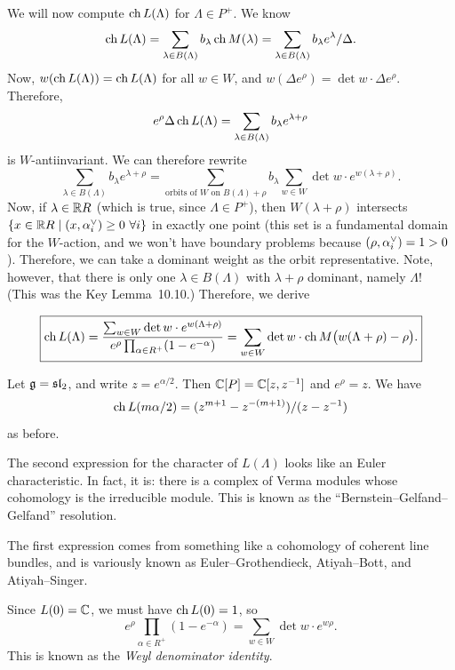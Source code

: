 We will now compute $\operatorname{ch} L(\Lambda)$ for $\Lambda \in P^+$. We know
\[
  \operatorname{ch} L(\Lambda) = \sum_{\lambda \in B(\Lambda)} b_\lambda \operatorname{ch} M(\lambda)
    = \sum_{\lambda \in B(\Lambda)} b_\lambda e^\lambda/\Delta.
\]
Now, $w(\operatorname{ch} L(\Lambda)) = \operatorname{ch} L(\Lambda)$ for all $w \in W$, and
$w(\Delta e^\rho) = \det w \cdot \Delta e^\rho$. Therefore,
\[
  e^\rho\Delta \operatorname{ch} L(\Lambda) = \sum_{\lambda \in B(\Lambda)} b_\lambda e^{\lambda+\rho}
\]
is $W$-antiinvariant. We can therefore rewrite
\[
  \sum_{\lambda \in B(\Lambda)} b_\lambda e^{\lambda+\rho}
  = \sum_{\text{orbits of } W \text{ on } B(\Lambda) + \rho} b_\lambda
    \sum_{w \in W} \det w \cdot e^{w(\lambda+\rho)}.
\]
Now, if $\lambda \in \mathbb{R} R$ (which is true, since $\Lambda \in P^+$), then
$W(\lambda + \rho)$ intersects
$\{x \in \mathbb{R} R \mid (x, \alpha_i^{\vee}) \geq 0 \ \forall i\}$ in exactly one point
(this set is a fundamental domain for the $W$-action, and we won't have
boundary problems because $(\rho, \alpha_i^{\vee}) = 1 > 0$). Therefore, we can
take a dominant weight as the orbit representative. Note, however, that there
is only one $\lambda \in B(\Lambda)$ with $\lambda + \rho$ dominant, namely
$\Lambda$! (This was the Key Lemma~10.10.) Therefore, we derive

\begin{theorem}
\[
  \boxed{\operatorname{ch} L(\Lambda)
    = \frac{\sum_{w \in W} \det w \cdot e^{w(\Lambda+\rho)}}{e^\rho\prod_{\alpha \in R^+} (1 - e^{-\alpha})}
    = \sum_{w \in W} \det w \cdot \operatorname{ch} M\bigl(w(\Lambda + \rho) - \rho\bigr).}
\]
\end{theorem}

\begin{example}
Let $\mathfrak{g} = \mathfrak{sl}_2$, and write $z = e^{\alpha/2}$. Then $\mathbb{C}[P] = \mathbb{C}[z, z^{-1}]$
and $e^\rho = z$. We have
\[
  \operatorname{ch} L(m\alpha/2) = (z^{m+1} - z^{-(m+1)})/(z - z^{-1})
\]
as before.
\end{example}

\begin{remark}
The second expression for the character of $L(\Lambda)$ looks like an Euler
characteristic. In fact, it is: there is a complex of Verma modules whose
cohomology is the irreducible module. This is known as the
``Bernstein--Gelfand--Gelfand'' resolution.

The first expression comes from something like a cohomology of coherent line
bundles, and is variously known as Euler--Grothendieck, Atiyah--Bott, and
Atiyah--Singer.
\end{remark}

\begin{corollary}
Since $L(0) = \mathbb{C}$, we must have $\operatorname{ch} L(0) = 1$, so
\[
  e^\rho\prod_{\alpha \in R^+} (1 - e^{-\alpha}) = \sum_{w \in W} \det w \cdot e^{w\rho}.
\]
This is known as the \emph{Weyl denominator identity}.
\end{corollary}

